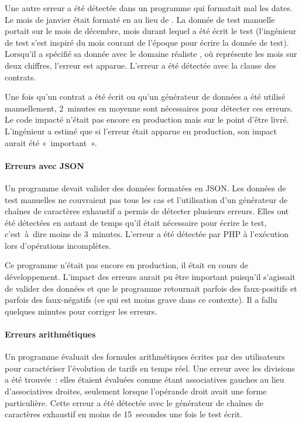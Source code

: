 Une autre erreur a été détectée dans un programme qui formatait mal les dates.
Le mois de janvier était formaté en  au lieu de . La donnée de
test manuelle portait sur le mois de décembre, mois durant lequel a été écrit le
test (l'ingénieur de test s'est inspiré du mois courant de l'époque pour écrire
la donnée de test). Lorsqu'il a spécifié sa donnée avec le domaine réaliste
, où  représente les mois sur deux chiffres, l'erreur
est apparue. L'erreur a été détectée avec la clause \aensures des contrats.

Une fois qu'un contrat a été écrit ou qu'un générateur de données a été utilisé
manuellement, 2~minutes en moyenne sont nécessaires pour détecter ces erreurs.
Le code impacté n'était pas encore en production mais sur le point d'être livré.
L'ingénieur a estimé que si l'erreur était apparue en production, son impact
aurait été «~important~».

\paragraph{Erreurs avec JSON} Un programme devait valider des données formatées
en JSON. Les données de test manuelles ne couvraient pas tous les cas et
l'utilisation d'un générateur de chaînes de caractères exhaustif a permis de
détecter plusieurs erreurs. Elles ont été détectées en autant de temps qu'il
était nécessaire pour écrire le test, c'est~à~dire moins de 3~minutes. L'erreur
a été détectée par PHP à l'exécution lors d'opérations incomplètes.

Ce programme n'était pas encore en production, il était en cours de
développement. L'impact des erreurs aurait pu être important puisqu'il
s'agissait de valider des données et que le programme retournait parfois des
faux-positifs et parfois des faux-négatifs (ce qui est moins grave dans ce
contexte). Il a fallu quelques minutes pour corriger les erreurs.

\paragraph{Erreurs arithmétiques} Un programme évaluait des formules
arithmétiques écrites par des utilisateurs pour caractériser l'évolution de
tarifs en temps réel. Une erreur avec les divisions a été trouvée~: elles
étaient évaluées comme étant associatives gauches au lieu d'associatives
droites, seulement lorsque l'opérande droit avait une forme particulière. Cette
erreur a été détectée avec le générateur de chaînes de caractères exhaustif en
moins de 15~secondes une fois le test écrit.

